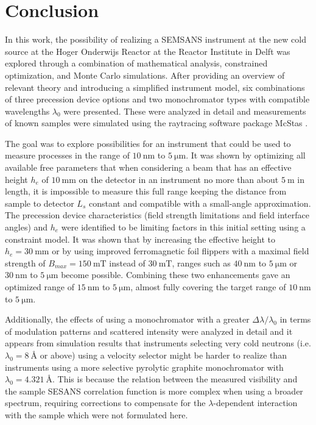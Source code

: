 \chapter{Conclusion}
\label{chapter:conclusion}
\label{c7:conclusion}
In this work, the possibility of realizing a SEMSANS instrument at the new cold source at the Hoger Onderwijs Reactor at the Reactor Institute in Delft was explored through a combination of mathematical analysis, constrained optimization, and Monte Carlo simulations. After providing an overview of relevant theory and introducing a simplified instrument model, six combinations of three precession device options and two monochromator types with compatible wavelengths $\lambda_0$ were presented. These were analyzed in detail and measurements of known samples were simulated using the raytracing software package McStas \cite{willendrup2020}. 

The goal was to explore possibilities for an instrument that could be used to measure processes in the range of $\SI{10}{\nano\meter}$ to $\SI{5}{\micro\meter}$. It was shown by optimizing all available free parameters that when considering a beam that has an effective height $h_e$ of $\SI{10}{\milli\meter}$ on the detector in an instrument no more than about $\SI{5}{\meter}$ in length, it is impossible to measure this full range keeping the distance from sample to detector $L_s$ constant and compatible with a small-angle approximation. The precession device characteristics (field strength limitations and field interface angles) and  $h_e$ were identified to be limiting factors in this initial setting using a constraint model. It was shown that by increasing the effective height to $h_e = \SI{30}{\milli\meter}$ or by using improved ferromagnetic foil flippers with a maximal field strength of $B_{max} = \SI{150}{\milli\tesla}$ instead of $\SI{30}{\milli\tesla}$, ranges such as $\SI{40}{\nano\meter}$ to $\SI{5}{\micro\meter}$ or $\SI{30}{\nano\meter}$ to $\SI{5}{\micro\meter}$ become possible. Combining these two enhancements gave an optimized range of $\SI{15}{\nano\meter}$ to $\SI{5}{\micro\meter}$, almost fully covering the target range of $\SI{10}{\nano\meter}$ to $\SI{5}{\micro\meter}$.

Additionally, the effects of using a monochromator with a greater $\Delta\lambda/\lambda_0$ in terms of modulation patterns and scattered intensity were analyzed in detail and it appears from simulation results that instruments selecting very cold neutrons (i.e. $\lambda_0 = \SI{8}{\angstrom}$ or above) using a velocity selector might be harder to realize than instruments using a more selective pyrolytic graphite monochromator with $\lambda_0 = \SI{4.321}{\angstrom}$. This is because the relation between the measured visibility and the sample SESANS correlation function is more complex when using a broader spectrum, requiring corrections to compensate for the $\lambda$-dependent interaction with the sample which were not formulated here.

